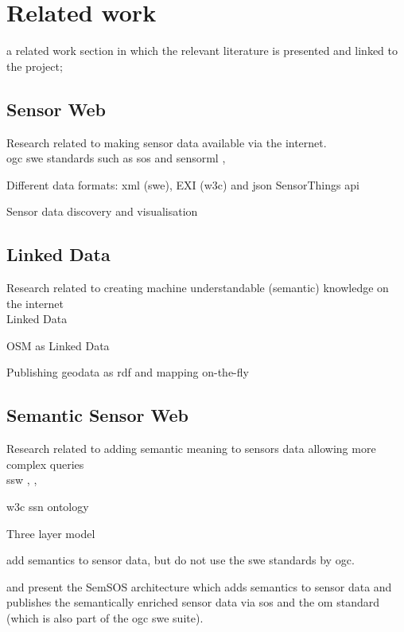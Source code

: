 \chapter{Related work}
\label{chap:rw}

a related work section in which the relevant literature is presented and linked to the project;


\section{Sensor Web}
Research related to making sensor data available via the internet. \\


\ac{ogc} \ac{swe} standards such as \ac{sos} and \ac{sensorml} \citep{SW:OGC}, \citep{SW:Botts}

Different data formats: \ac{xml} (\ac{swe}), EXI (\ac{w3c}) and \ac{json} SensorThings \ac{api} \citep{IOT:Zanelli}

Sensor data discovery \citep{SW:OGC2} and visualisation \citep{SW:Yoo}


\section{Linked Data}
Research related to creating machine understandable (semantic) knowledge on the internet \\

Linked Data \citep{LD:Berners-lee}

OSM as Linked Data \citep{LD:Auer}

Publishing geodata as \ac{rdf} and mapping on-the-fly \citep{LD:Missier}


\section{Semantic Sensor Web}
Research related to adding semantic meaning to sensors data allowing more complex queries \\ 

\ac{ssw} \citep{SSW:Sheth}, \citep{SSW:deMel}, \citep{SSW:Bakillah}

\ac{w3c} \ac{ssn} ontology \citep{SSW:SSN_incubatorGroup}

Three layer model
 
\cite{SSW:Huang} add semantics to sensor data, but do not use the \ac{swe} standards by \ac{ogc}.

\cite{SSW:Henson} and \cite{SSW:Pschorr} present the SemSOS architecture which adds semantics to sensor data and publishes the semantically enriched sensor data via \ac{sos} and the \ac{om} standard (which is also part of the \ac{ogc} \ac{swe} suite).

